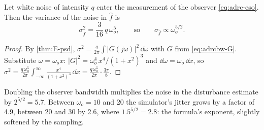 \begin{theorem}
\label{thm:adrcbw-scaling}
Let white noise of intensity $q$ enter the measurement of the observer \eqref{eq:adrc-eso}. Then the variance of the noise in $\hat f$ is
\begin{equation}\label{eq:adrcbw-var}
  \sigma_{\hat f}^2 = \frac{3}{16}\,q\,\omega_o^5 , \qquad\text{so}\qquad \sigma_{\hat f} \propto \omega_o^{5/2} .
\end{equation}
\end{theorem}
\begin{proof}
By \cref{thm:E-psd}, $\sigma^2 = \frac{q}{2\pi}\int|G(j\omega)|^2\,\dd\omega$ with $G$ from \cref{eq:adrcbw-G}. Substitute $\omega = \omega_o x$: $|G|^2 = \omega_o^4\,x^4/(1 + x^2)^3$ and $\dd\omega = \omega_o\,\dd x$, so $\sigma^2 = \frac{q\,\omega_o^5}{2\pi}\int_{-\infty}^\infty \frac{x^4}{(1 + x^2)^3}\,\dd x = \frac{q\,\omega_o^5}{2\pi}\cdot\frac{3\pi}{8}$.
\end{proof}

Doubling the observer bandwidth multiplies the noise in the disturbance estimate by $2^{5/2} = 5.7$. Between $\omega_o = 10$ and 20 the simulator's jitter grows by a factor of 4.9, between 20 and 30 by 2.6, where $1.5^{5/2} = 2.8$: the formula's exponent, slightly softened by the sampling.

